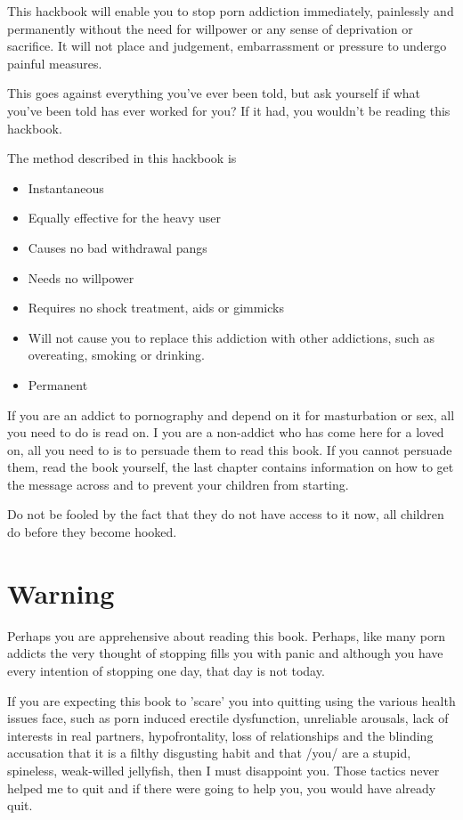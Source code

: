 \documentclass[easypeasy.tex]{subfiles}
\begin{document}
This hackbook will enable you to stop porn addiction immediately, painlessly and permanently without the need for willpower or any sense of deprivation or sacrifice. It will not place and judgement, embarrassment or pressure to undergo painful measures.

This goes against everything you've ever been told, but ask yourself if what you've been told has ever worked for you? If it had, you wouldn't be reading this hackbook.

The method described in this hackbook is
\begin{itemize}
\item Instantaneous
\item Equally effective for the heavy user
\item Causes no bad withdrawal pangs
\item Needs no willpower
\item Requires no shock treatment, aids or gimmicks
\item Will not cause you to replace this addiction with other addictions, such as overeating, smoking or drinking.
\item Permanent
\end{itemize}
If you are an addict to pornography and depend on it for masturbation or sex, all you need to do is read on.
I you are a non-addict who has come here for a loved on, all you need to is to persuade them to read this book.
If you cannot persuade them, read the book yourself, the last chapter contains information on how to get the message across and to prevent your children from starting.

Do not be fooled by the fact that they do not have access to it now, all children do before they become hooked.

\section{Warning}
Perhaps you are apprehensive about reading this book. Perhaps, like many porn addicts the very thought of stopping fills you with panic and although you have every intention of stopping one day, that day is not today.

If you are expecting this book to 'scare' you into quitting using the various health issues face, such as porn induced erectile dysfunction, unreliable arousals, lack of interests in real partners, hypofrontality, loss of relationships and the blinding accusation that it is a filthy disgusting habit and that /you/ are a stupid, spineless, weak-willed jellyfish, then I must disappoint you. Those tactics never helped me to quit and if there were going to help you, you would have already quit.
\end{document}
